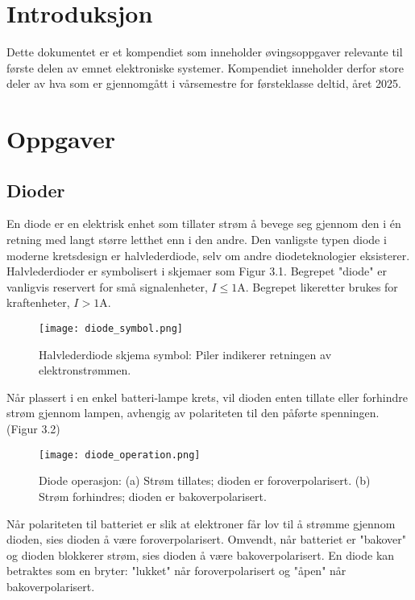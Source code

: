 \documentclass[12pt]{report}
\begin{document}


\tableofcontents
\newpage


\chapter{Introduksjon}
Dette dokumentet er et kompendiet som inneholder øvingsoppgaver relevante til første delen av emnet elektroniske systemer. Kompendiet inneholder derfor store deler av hva som er gjennomgått i vårsemestre for førsteklasse deltid, året 2025.


\chapter{Oppgaver}


\section{Dioder}



En diode er en elektrisk enhet som tillater strøm å bevege seg gjennom den i én retning med langt større letthet enn i den andre. Den vanligste typen diode i moderne kretsdesign er halvlederdiode, selv om andre diodeteknologier eksisterer. Halvlederdioder er symbolisert i skjemaer som Figur 3.1. Begrepet "diode" er vanligvis reservert for små signalenheter, \(I \leq 1 \text{A}\). Begrepet likeretter brukes for kraftenheter, \(I > 1 \text{A}\).

\begin{figure}[h]
\centering
\texttt{[image: diode\_symbol.png]}
\caption{Halvlederdiode skjema symbol: Piler indikerer retningen av elektronstrømmen.}
\end{figure}

Når plassert i en enkel batteri-lampe krets, vil dioden enten tillate eller forhindre strøm gjennom lampen, avhengig av polariteten til den påførte spenningen. (Figur 3.2)

\begin{figure}[h]
\centering
\texttt{[image: diode\_operation.png]}
\caption{Diode operasjon: (a) Strøm tillates; dioden er foroverpolarisert. (b) Strøm forhindres; dioden er bakoverpolarisert.}
\end{figure}

Når polariteten til batteriet er slik at elektroner får lov til å strømme gjennom dioden, sies dioden å være foroverpolarisert. Omvendt, når batteriet er "bakover" og dioden blokkerer strøm, sies dioden å være bakoverpolarisert. En diode kan betraktes som en bryter: "lukket" når foroverpolarisert og "åpen" når bakoverpolarisert.
\end{document}
